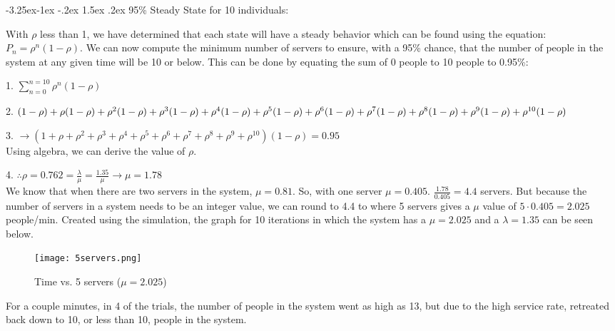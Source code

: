 \documentclass[11pt]{article}
\makeatletter
\renewcommand\subsection{\@startsection{subsection}{2}{\z@}%
                                         {-3.25ex\@plus -1ex \@minus -.2ex}%
                                         {1.5ex \@plus .2ex}%
                                         {\normalfont\fontfamily{phv}\fontsize{14}{17}\bfseries}}
\makeatother
\begin{document}
\subsection{95\% Steady State for 10 individuals:} \label{s:numerical}

With $\rho$ less than 1, we have determined that each state will have a steady behavior which can be found using the equation: $P_n = \rho^n(1-\rho)$. We can now compute the minimum number of servers to ensure, with a 95\% chance, that the number of people in the system at any given time will be 10 or below. This can be done by equating the sum of 0 people to 10 people to 0.95\%:

1. \hspace{3mm}$\sum_{n=0}^{n=10} \rho^n(1-\rho)$

2. \hspace{3mm}$(1-\rho)+\rho(1-\rho)+\rho^2(1-\rho)+\rho^3(1-\rho)+\rho^4(1-\rho)+\rho^5(1-\rho)+\\
\rho^6(1-\rho)+\rho^7(1-\rho)+\rho^8(1-\rho)+\rho^9(1-\rho)+\rho^{10}(1-\rho)$

3. \hspace{3mm}$\xrightarrow{}(1+\rho+\rho^2+\rho^3+\rho^4+\rho^5+\rho^6+\rho^7+\rho^8+\rho^9+\rho^{10})(1-\rho) = 0.95$\\
Using algebra, we can derive the value of $\rho$.

4. \hspace{3mm} $\therefore \rho = 0.762 = \frac{\lambda}{\mu} = \frac{1.35}{\mu} \xrightarrow{} \mu = 1.78$\\

We know that when there are two servers in the system, $\mu=0.81$. So, with one server $\mu=0.405$. $\frac{1.78}{0.405} = 4.4$ servers. But because the number of servers in a system needs to be an integer value, we can round to 4.4 to where 5 servers gives a $\mu$ value of $5\cdot 0.405 = 2.025$ people/min. Created using the simulation, the graph for 10 iterations in which the system has a $\mu = 2.025$ and a $\lambda = 1.35$ can be seen below.

\begin{figure}[h!]
    \centering
    \texttt{[image: 5servers.png]}
    \caption{Time vs. 5 servers ($\mu = 2.025$)}
    \label{5servers}
\end{figure}
\FloatBarrier
For a couple minutes, in 4 of the trials, the number of people in the system went as high as 13, but due to the high service rate, retreated back down to 10, or less than 10, people in the system.
\end{document}
